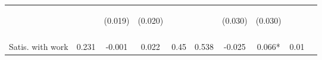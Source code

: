 \begin{tabular}{lccccccccc}
 & \begin{footnotesize}\end{footnotesize} & \begin{footnotesize}(0.019)\end{footnotesize} & \begin{footnotesize}(0.020)\end{footnotesize} & \begin{footnotesize}\end{footnotesize} & \begin{footnotesize}\end{footnotesize} & \begin{footnotesize}(0.030)\end{footnotesize} & \begin{footnotesize}(0.030)\end{footnotesize} & \begin{footnotesize}\end{footnotesize} & \begin{footnotesize}\end{footnotesize}\\
 & \begin{footnotesize}\end{footnotesize} & \begin{footnotesize}[0.032]\end{footnotesize} & \begin{footnotesize}[0.021]\end{footnotesize} & \begin{footnotesize}\end{footnotesize} & \begin{footnotesize}\end{footnotesize} & \begin{footnotesize}[0.753]\end{footnotesize} & \begin{footnotesize}[1.000]\end{footnotesize} & \begin{footnotesize}\end{footnotesize} & \begin{footnotesize}\end{footnotesize}\\
\noalign{\smallskip}Satis. with work & 0.231 & -0.001 & 0.022 & 0.45 & 0.538 & -0.025 & 0.066* & 0.01 & \\

\end{tabular}
